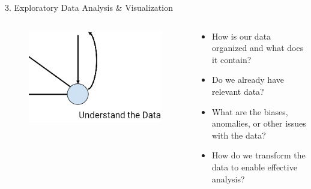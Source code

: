 \documentclass[aspectratio=169]{../latex_main/tntbeamer}  %
\begin{document}
    \begin{frame}{3. Exploratory Data Analysis \& Visualization}
        \begin{columns}
            \begin{column}{.3\textwidth}
            \begin{figure}
                \includegraphics[scale=.45]{bild19}
                
            \end{figure}
            \end{column}
            \begin{column}{.4\textwidth}
            \begin{itemize}
                \item How is our data organized and what does it contain?
                \item Do we already have relevant data?
                \item What are the biases, anomalies, or other issues with the data?
                \item How do we transform the data to enable effective analysis?
            \end{itemize}
            \end{column}
  
        \end{columns}
    \end{frame}
\end{document}
